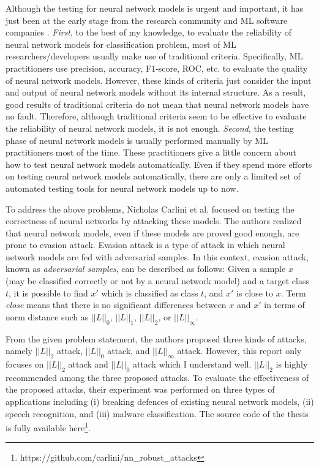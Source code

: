 \documentclass[12pt]{article}
\begin{document}
Although the testing for neural network models is urgent and important, it has just been at the early stage from the research community and ML software companies \cite{DeepXplore}.  \textit{First}, to the best of my knowledge, to evaluate the reliability of neural network models for classification problem, most of ML researchers/developers usually make use of traditional criteria. Specifically, ML practitioners use precision, accuracy, F1-score, ROC, etc. to evaluate the quality of neural network models. However, these kinds of criteria just consider the input and output of neural network models without its internal structure. As a result, good results of traditional criteria do not mean that neural network models have no fault. Therefore, although traditional criteria seem to be effective to evaluate the reliability of neural network models, it is not enough. 
\textit{Second}, the testing phase of neural network models is usually performed manually by ML practitioners most of the time. These practitioners give a little concern about how to test neural network models automatically. Even if they spend more efforts on testing neural network models automatically, there are only a limited set of automated testing tools for neural network models up to now. 

To address the above problems, Nicholas Carlini et al. focused on testing the correctness of neural networks by attacking these models. The authors realized that neural network models, even if these models are proved good enough, are prone to evasion attack. Evasion attack is a type of attack in which neural network models are fed with adversarial samples. In this context, evasion attack, known as \textit{adversarial samples}, can be described as follows: Given a sample $x$ (may be classified correctly or not by a neural network model) and a target class $t$, it is possible to find $x'$ which is classified as class $t$, and $x'$ is close to $x$. Term \textit{close} means that there is no significant differences between $x$ and $x'$ in terms of norm distance such as $||L||_0$, $||L||_1$, $||L||_2$, or $||L||_\infty$. 

From the given problem statement, the authors proposed three kinds of attacks, namely $||L||_2$ attack, $||L||_0$ attack, and $||L||_\infty$ attack. However, this report only focuses on $||L||_2$ attack and $||L||_0$ attack which I understand well. $||L||_2$ is highly recommended among the three proposed attacks. To evaluate the effectiveness of the proposed attacks, their experiment was performed on three types of applications including (i) breaking defences of existing neural network models, (ii) speech recognition, and (iii) malware classification. The source code of the thesis is fully available here\footnote{https://github.com/carlini/nn\_robust\_attacks}.
\end{document}
